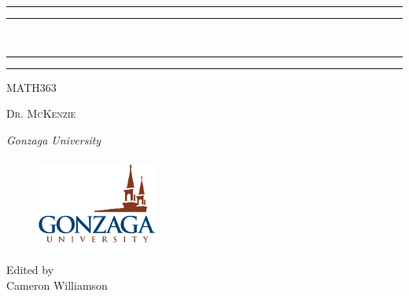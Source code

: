 \begin{titlepage}
  \rule{\textwidth}{1.6pt}\vspace*{-\baselineskip}\vspace*{2pt} %
  \rule{\textwidth}{0.4pt} %
  
  \vspace{0.75\baselineskip} %
  
  {\huge {}\\} %
  
  \vspace{0.75\baselineskip} %
  
  \rule{\textwidth}{0.4pt}\vspace*{-\baselineskip}\vspace{3.2pt} %
  \rule{\textwidth}{1.6pt} %
  
  \vspace{2\baselineskip} %
  
  
  \LARGE{MATH363} 
  
  \vspace*{3\baselineskip} %
  
  
  
  \vspace{0.5\baselineskip} 
  
  {\scshape   \LARGE Dr. McKenzie\\ } %
  
  \vspace{0.2\baselineskip} 
  
  \textit{\Large Gonzaga University} 
  
  \vfill 
  
  
  \begin{figure}[!h]
      \centering
      \includegraphics[width = 4cm, height= 3cm]{resource/images/Gonzaga_University_Logo.jpg}%
  \end{figure}
  \vspace{0.3\baselineskip} 
  
  
  {\large Edited by\\  Cameron Williamson}
  \end{titlepage}